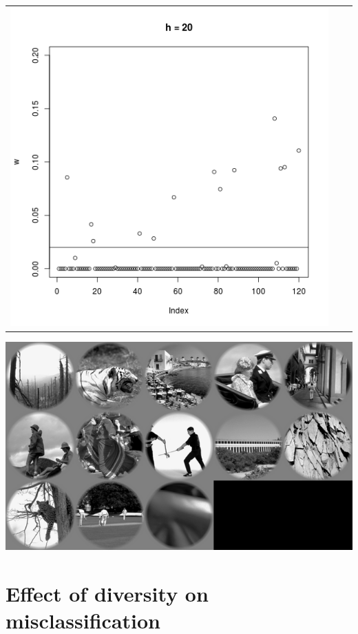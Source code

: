 \documentclass{beamer}
\begin{document}
\begin{frame}
\begin{tabular}{ccc}
\includegraphics[scale=0.2]{valid_weight20.png}
\end{tabular}
\begin{center}
\includegraphics[scale=0.3]{valid_20.png}
\end{center}
\end{frame}

\section{Effect of diversity on misclassification}

\frame{\sectionpage}
\end{document}
